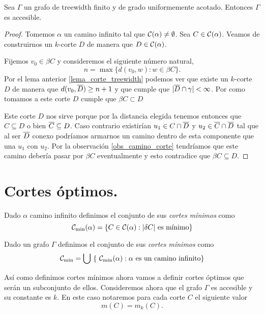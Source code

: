 \documentclass[tesis.tex]{subfiles}
\begin{document}
\begin{teo}\label{teo_treewidth_fin_accesible}
	Sea $\Gamma$ un grafo de treewidth finito y de grado uniformemente acotado.
	Entonces $\Gamma$ es accesible.
\end{teo}
\begin{proof}
	Tomemos $\alpha$ un camino infinito tal que ${\cal C}(\alpha) \neq \emptyset$.
	Sea $C \in {\cal C}(\alpha)$.
	Veamos de construirnos un $k$-corte $D$ de manera que $D \in {\cal C}(\alpha)$.
	
	Fijemos $v_0  \in \beta C$ y consideremos el siguiente número natural,
	\[
	n = \max \{ d(v_0,w) : w \in \beta C  \}.
	\]
	Por el lema anterior \ref{lema_corte_treewidth} podemos ver que existe un $k$-corte $D$ de manera que $d(v_0, \overline D) \ge n+1$ y que cumple que $|\overline D \cap \gamma| < \infty$.
	Por como tomamos a este corte $D$ cumple que $\beta C \subset D$
	
	Este corte $D$ nos sirve porque por la distancia elegida tenemos entonces que $C \subseteq D$ o bien $\overline C \subseteq D$.
	Caso contrario existirían $u_1 \in C \cap \overline D$ y $u_2 \in \overline C \cap \overline D$ tal que al ser $\overline D$ conexo podríamos armarnos un camino dentro de esta componente que una $u_1$ con $u_2$.
	Por la observación \ref{obs_camino_corte} tendríamos que este camino debería pasar por $\beta C$ eventualmente y esto contradice que $\beta C \subseteq D$.
\end{proof}


\section{Cortes óptimos.}

\begin{deff}
	Dado $\alpha$ camino infinito definimos el conjunto de sus \emph{cortes mínimos} como
	\[
	\cam = \{  C \in \ca : |\delta C| \ \text{es mínimo}  \}
	\]
	
	Dado un grafo $\Gamma$ definimos el conjunto de sus \emph{cortes mínimos} como 
	\[
	{\cal C}_{\text{min}} = \bigcup \ \{ \ {\cal C}_{\text{min}}(\alpha) : \alpha \ \text{es un camino infinito}  \}
	\]
\end{deff}


Así como definimos cortes mínimos ahora vamos a definir cortes óptimos que serán un subconjunto de ellos.
Consideremos ahora que el grafo $\Gamma$ es accesible y su constante es $k$.
En este caso notaremos para cada corte $C$ el siguiente valor
\[
m(C) = m_k(C).
\]
\end{document}

